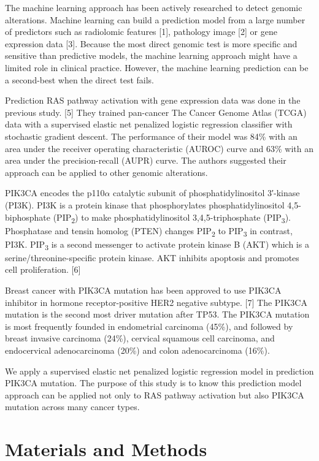 \documentclass[10pt,letterpaper]{article}
\begin{document}
The machine learning approach has been actively researched to detect
genomic alterations. Machine learning can build a prediction model from
a large number of predictors such as radiolomic features {[}1{]},
pathology image {[}2{]} or gene expression data {[}3{]}. Because the
most direct genomic test is more specific and sensitive than predictive
models, the machine learning approach might have a limited role in
clinical practice. However, the machine learning prediction can be a
second-best when the direct test fails.

Prediction RAS pathway activation with gene expression data was done in
the previous study. {[}5{]} They trained pan-cancer The Cancer Genome
Atlas (TCGA) data with a supervised elastic net penalized logistic
regression classifier with stochastic gradient descent. The performance
of their model was 84\% with an area under the receiver operating
characteristic (AUROC) curve and 63\% with an area under the
precision-recall (AUPR) curve. The authors suggested their approach can
be applied to other genomic alterations.

PIK3CA encodes the p110\(\alpha\) catalytic subunit of
phosphatidylinositol 3′-kinase (PI3K). PI3K is a protein kinase that
phosphorylates phosphatidylinositol 4,5-biphosphate
(PIP\textsubscript{2}) to make phosphatidylinositol 3,4,5-triphosphate
(PIP\textsubscript{3}). Phosphatase and tensin homolog (PTEN) changes
PIP\textsubscript{2} to PIP\textsubscript{3} in contrast, PI3K.
PIP\textsubscript{3} is a second messenger to activate protein kinase B
(AKT) which is a serine/threonine-specific protein kinase. AKT inhibits
apoptosis and promotes cell proliferation. {[}6{]}

Breast cancer with PIK3CA mutation has been approved to use PIK3CA
inhibitor in hormone receptor-positive HER2 negative subtype. {[}7{]}
The PIK3CA mutation is the second most driver mutation after TP53. The
PIK3CA mutation is most frequently founded in endometrial carcinoma
(45\%), and followed by breast invasive carcinoma (24\%), cervical
squamous cell carcinoma, and endocervical adenocarcinoma (20\%) and
colon adenocarcinoma (16\%).

We apply a supervised elastic net penalized logistic regression model in
prediction PIK3CA mutation. The purpose of this study is to know this
prediction model approach can be applied not only to RAS pathway
activation but also PIK3CA mutation across many cancer types.

\hypertarget{materials-and-methods}{%
\section{Materials and Methods}\label{materials-and-methods}}
\end{document}
